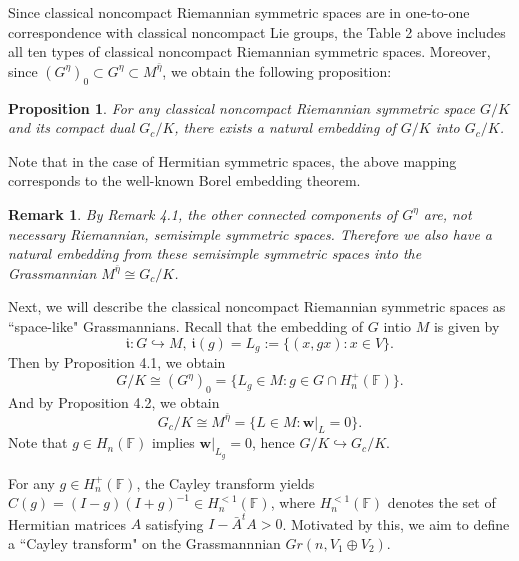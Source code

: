 \documentclass{article}
\newtheorem{prop}{Proposition}[section]
\newtheorem{rmk}{Remark}[section]
\begin{document}
Since classical noncompact Riemannian symmetric spaces are in one-to-one correspondence with classical noncompact Lie groups, the Table 2 above includes all ten types of classical noncompact Riemannian symmetric spaces.
Moreover, since $(G^{\eta})_0 \subset G^{\eta} \subset  M^{\bar{\eta}}$, we obtain the following proposition:

\begin{prop}
For any classical noncompact Riemannian symmetric space $G/K$ and its compact dual $G_c/K$, there exists a natural embedding of $G/K$ into $G_c/K$.
\end{prop}

Note that in the case of Hermitian symmetric spaces, the above mapping corresponds to the well-known Borel embedding theorem.

\begin{rmk}
By Remark 4.1, the other connected components of $G^{\eta}$  are, not necessary Riemannian, semisimple symmetric spaces. Therefore we also have a natural embedding from these
 semisimple symmetric spaces into the Grassmannian $M^{\bar{\eta}} \cong G_c/K$.
\end{rmk}


Next, we will describe the classical noncompact Riemannian symmetric spaces as ``space-like" Grassmannians. Recall that the embedding of $G$ intio $M$ is given by
\[
\mathfrak{i}: G \hookrightarrow M, ~  \mathfrak{i}(g)= L_g:=\{(x, gx): x \in V\}.
\]
Then by Proposition 4.1, we obtain
\[
G/K \cong (G^{\eta})_0 =\{L_g \in M: g \in G \cap H_n^{+}(\mathbb{F})\}.
\]
And by Proposition 4.2, we obtain
\[
G_c/K \cong M^{\bar{\eta}} =\{L \in M: \mathbf{w}|_L=0\}.
\]
Note that $g \in  H_n(\mathbb{F})$  implies $\mathbf{w}|_{L_g}=0$, hence $G/K \hookrightarrow G_c/K $.

\bigskip

For any $g \in H_n^{+}(\mathbb{F})$, the Cayley transform yields $C(g)=(I-g)(I+g)^{-1} \in H_n^{<1}(\mathbb{F})$, where $H_n^{<1}(\mathbb{F})$ denotes the set of
Hermitian matrices $A$ satisfying $I-\bar{A}^tA>0$. Motivated by this, we aim to define a ``Cayley transform" on the Grassmannnian $Gr(n,  V_1\oplus V_2)$.
\end{document}
